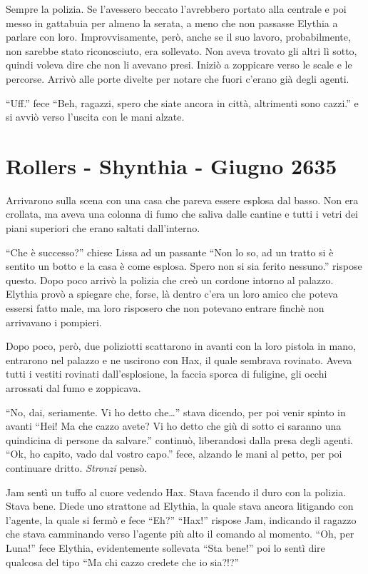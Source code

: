     Sempre la polizia. Se l'avessero beccato l'avrebbero portato alla
    centrale e poi messo in gattabuia per almeno la serata, a meno che non
    passasse Elythia a parlare con loro.
    Improvvisamente, però, anche se il suo lavoro, probabilmente, non
    sarebbe stato riconosciuto, era sollevato. Non aveva trovato gli altri
    lì sotto, quindi voleva dire che non li avevano presi. Iniziò a
    zoppicare verso le scale e le percorse. Arrivò alle porte divelte per
    notare che fuori c'erano già degli agenti.

    ``Uff.'' fece ``Beh, ragazzi, spero che siate ancora in città,
    altrimenti sono cazzi.'' e si avviò verso l'uscita con le mani alzate.

    \section{Rollers - Shynthia - Giugno 2635}
    Arrivarono sulla scena con una casa che pareva essere esplosa dal
    basso. Non era crollata, ma aveva una colonna di fumo che saliva dalle
    cantine e tutti i vetri dei piani superiori che erano saltati
    dall'interno.

    ``Che è successo?'' chiese Lissa ad un passante ``Non lo so, ad un
    tratto si è sentito un botto e la casa è come esplosa. Spero non si sia
    ferito nessuno.'' rispose questo. Dopo poco arrivò la polizia che creò
    un cordone intorno al palazzo. Elythia provò a spiegare che, forse, là
    dentro c'era un loro amico che poteva essersi fatto male, ma loro
    risposero che non potevano entrare finchè non arrivavano i pompieri.
    
    Dopo poco, però, due poliziotti scattarono in avanti con la loro
    pistola in mano, entrarono nel palazzo e ne uscirono con Hax, il quale
    sembrava rovinato. Aveva tutti i vestiti rovinati dall'esplosione, la
    faccia sporca di fuligine, gli occhi arrossati dal fumo e zoppicava.

    ``No, dai, seriamente. Vi ho detto che\dots{}'' stava dicendo, per poi
    venir spinto in avanti ``Hei! Ma che cazzo avete? Vi ho detto che giù
    di sotto ci saranno una quindicina di persone da salvare.'' continuò,
    liberandosi dalla presa degli agenti. ``Ok, ho capito, vado dal vostro
    capo.'' fece, alzando le mani al petto, per poi continuare dritto.
    \emph{Stronzi} pensò.

    Jam sentì un tuffo al cuore vedendo Hax. Stava facendo il duro con la
    polizia. Stava bene. Diede uno strattone ad Elythia, la quale stava
    ancora litigando con l'agente, la quale si fermò e fece ``Eh?''
    ``Hax!'' rispose Jam, indicando il ragazzo che stava camminando verso
    l'agente più alto il comando al momento. ``Oh, per Luna!'' fece
    Elythia, evidentemente sollevata ``Sta bene!'' poi lo sentì dire
    qualcosa del tipo ``Ma chi cazzo credete che io sia?!?''

